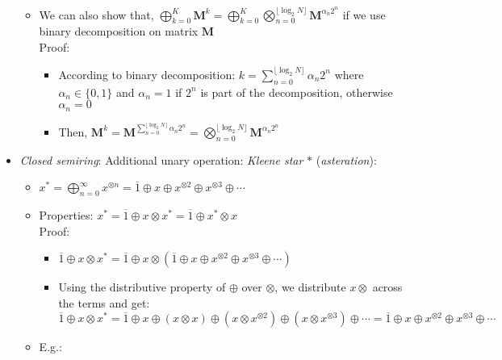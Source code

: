 \begin{itemize}
\begin{itemize}
\begin{itemize}
        \end{itemize}
        \item We can also show that, $ \bigoplus_{k=0}^{K} \boldsymbol{M}^k = \bigoplus_{k=0}^{K} \bigotimes_{n=0}^{\lfloor \log_2 N \rfloor} \boldsymbol{M}^{\alpha_n 2^n}$ if we use binary decomposition on matrix $\boldsymbol{M}$\\
        Proof:
        \begin{itemize}
            \item According to binary decomposition: $k = \sum_{n=0}^{\lfloor \log_2 N \rfloor} \alpha_n 2^n$ where $\alpha_n \in \{0, 1\}$ and $\alpha_n = 1$ if $2^n$ is part of the decomposition, otherwise $\alpha_n = 0$
            \item Then, $\boldsymbol{M}^k = \boldsymbol{M}^{\sum_{n=0}^{\lfloor \log_2 N \rfloor} \alpha_n 2^n} = \bigotimes_{n=0}^{\lfloor \log_2 N \rfloor} \boldsymbol{M}^{\alpha_n 2^n}$
        \end{itemize}
    \end{itemize}
    \item \emph{Closed semiring}: Additional unary operation: \emph{Kleene star} $*$ (\emph{asteration}):
    \begin{itemize}
        \item $
        x^* = \bigoplus_{n=0}^\infty x^{\otimes n} = \overline{1} \oplus x \oplus x^{\otimes 2} \oplus x^{\otimes 3} \oplus \cdots
        $
        \item Properties:
        $
        x^* = \overline{1} \oplus x \otimes x^* = \overline{1} \oplus x^* \otimes x
        $\\
        Proof:
        \begin{itemize}
            \item $ \overline{1} \oplus x \otimes x^* = \overline{1} \oplus x \otimes \left( \overline{1} \oplus x \oplus x^{\otimes 2} \oplus x^{\otimes 3} \oplus \cdots \right)$
            \item Using the distributive property of $ \oplus $ over $ \otimes $, we distribute $ x \otimes $ across the terms and get:
            $
            \overline{1} \oplus x \otimes x^* = \overline{1} \oplus x \oplus (x \otimes x) \oplus (x \otimes x^{\otimes 2}) \oplus (x \otimes x^{\otimes 3}) \oplus \cdots = \overline{1} \oplus x \oplus x^{\otimes 2} \oplus x^{\otimes 3} \oplus \cdots
            $
        \end{itemize}
        \item E.g.:
        \begin{itemize}

\end{itemize}
\end{itemize}
\end{itemize}
